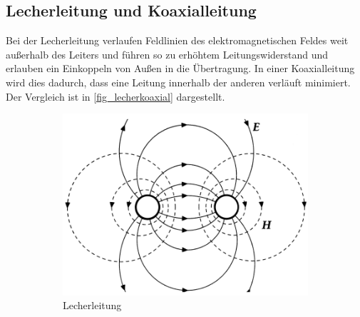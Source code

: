 \documentclass[
	a4paper,
	12pt,
	pagesize,
	ngerman
]{scrartcl}
\begin{document}
	\subsection{Lecherleitung und Koaxialleitung}
	Bei der Lecherleitung verlaufen Feldlinien des elektromagnetischen Feldes weit außerhalb des Leiters und führen so zu erhöhtem Leitungswiderstand und erlauben ein Einkoppeln von Außen in die Übertragung.
	In einer Koaxialleitung wird dies dadurch, dass eine Leitung innerhalb der anderen verläuft minimiert.
	Der Vergleich ist in \cref{fig_lecherkoaxial} dargestellt.


	\begin{figure}[H]
        \centering
        \begin{subfigure}[b]{0.55\textwidth}
            \centering
            \includegraphics[width=\textwidth]{img/lecher}
            \caption{
							Lecherleitung
						}
            \label{fig_lecher}
        \end{subfigure}
        \hfill
        \begin{subfigure}[b]{0.40\textwidth}
            \centering

\end{subfigure}
\end{figure}
\end{document}
